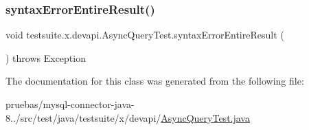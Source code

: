 \mbox{\label{classtestsuite_1_1x_1_1devapi_1_1_async_query_test_a2555da3829874adee73f7bcc760ea9a6}} 
\subsubsection{\texorpdfstring{syntax\+Error\+Entire\+Result()}{syntaxErrorEntireResult()}}
{\footnotesize\ttfamily void testsuite.\+x.\+devapi.\+Async\+Query\+Test.\+syntax\+Error\+Entire\+Result (\begin{DoxyParamCaption}{ }\end{DoxyParamCaption}) throws Exception}



The documentation for this class was generated from the following file\+:\begin{DoxyCompactItemize}
\item 
pruebas/mysql-\/connector-\/java-\/8../src/test/java/testsuite/x/devapi/\mbox{\hyperlink{_async_query_test_8java}{Async\+Query\+Test.\+java}}\end{DoxyCompactItemize}
